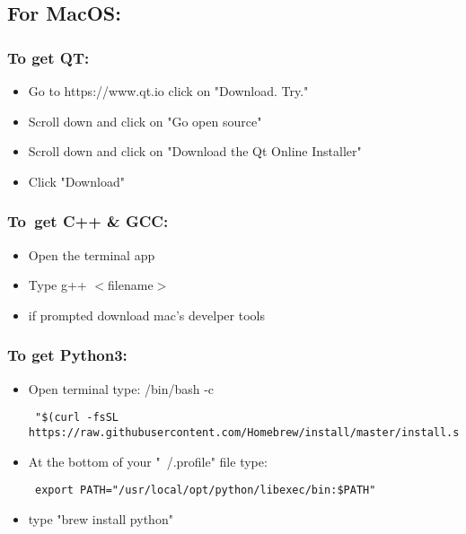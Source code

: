  \bigskip
  \subsection{For MacOS:}
  \subsubsection*{To get QT:}
    \begin{itemize}
      \item Go to https://www.qt.io click on "Download. Try."
      \item Scroll down and click on "Go open source"
      \item Scroll down and click on "Download the Qt Online Installer"
      \item Click "Download"
    \end{itemize}
  \subsubsection*{To\ get C++ \& GCC:}
    \begin{itemize}
      \item Open the terminal app
      \item Type g++ $<$filename$>$
      \item if prompted download mac's develper tools
    \end{itemize}
  \subsubsection*{To get Python3:}
    \begin{itemize}
      \item Open terminal type: /bin/bash -c \begin{verbatim} "$(curl -fsSL https://raw.githubusercontent.com/Homebrew/install/master/install.sh)" \end{verbatim}
      \item At the bottom of your "~/.profile" file  type: \begin{verbatim} export PATH="/usr/local/opt/python/libexec/bin:$PATH" \end{verbatim}
      \item type "brew install python"
    \end{itemize}
